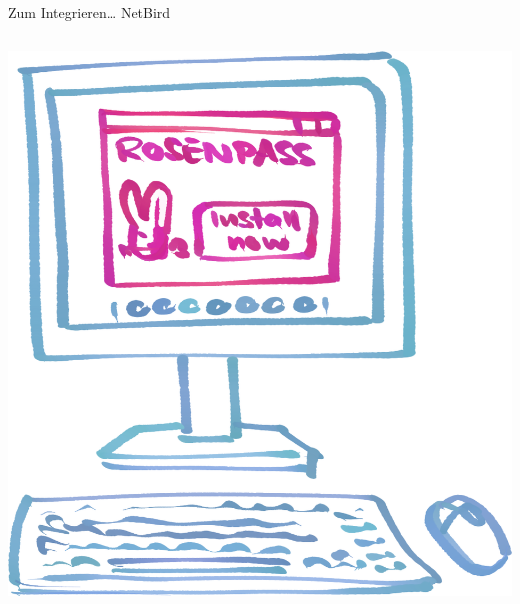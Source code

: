 \documentclass[german]{rosenpass-beamer}
\begin{document}
\begin{frame}{Zum Integrieren… NetBird}
\begin{columns}[c]
\begin{column}{0.2\textwidth}
\medskip
\includegraphics[width=\linewidth]{graphics/Illu-install.png}

\end{column}
\end{columns}
\end{frame}
\end{document}
